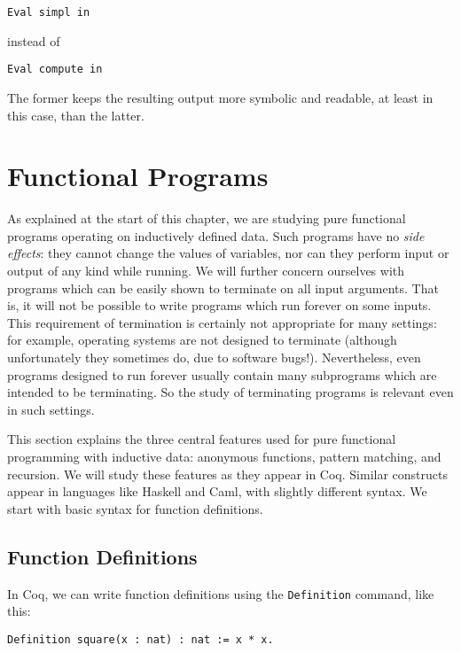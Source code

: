 \documentclass{book}[12pt]
\begin{document}
\begin{enumerate}
\begin{verbatim}
Eval simpl in 
\end{verbatim}

\noindent instead of

\begin{verbatim}
Eval compute in 
\end{verbatim}

\noindent The former keeps the resulting output more symbolic and
readable, at least in this case, than the latter.

\end{enumerate}

\section{Functional Programs}

As explained at the start of this chapter, we are studying pure
functional programs operating on inductively defined data.  Such
programs have no \emph{side effects}: they cannot change the values of
variables, nor can they perform input or output of any kind while
running.  We will further concern ourselves with programs which can be
easily shown to terminate on all input arguments.  That is, it will
not be possible to write programs which run forever on some inputs.
This requirement of termination is certainly not appropriate for many
settings: for example, operating systems are not designed to terminate
(although unfortunately they sometimes do, due to software bugs!).
Nevertheless, even programs designed to run forever usually contain
many subprograms which are intended to be terminating.  So the study
of terminating programs is relevant even in such settings.

This section explains the three central features used for pure
functional programming with inductive data: anonymous functions,
pattern matching, and recursion.  We will study these features as they
appear in Coq.  Similar constructs appear in languages like Haskell
and Caml, with slightly different syntax.  We start with basic syntax
for function definitions.

\subsection{Function Definitions}

In Coq, we can write function definitions using the \texttt{Definition}
command, like this:

\begin{verbatim}
Definition square(x : nat) : nat := x * x.
\end{verbatim}
\end{document}
